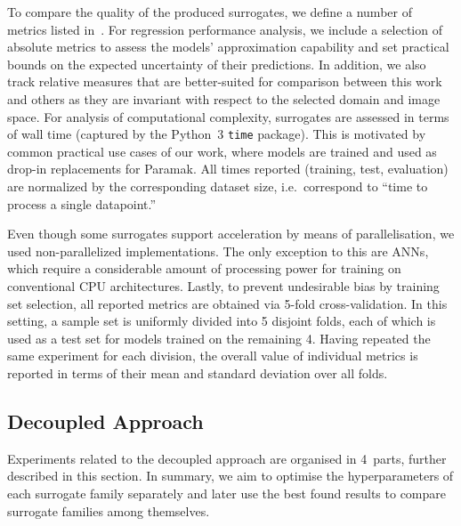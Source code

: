 To compare the quality of the produced surrogates, we define a number of metrics listed
in~. For regression performance analysis, we include a
selection of absolute metrics to assess the models' approximation capability and set
practical bounds on the expected uncertainty of their predictions. In addition, we also track
relative measures that are better-suited for comparison between this work and others as
they are invariant with respect to the selected domain and image space.
For analysis of computational complexity, surrogates are assessed in terms of wall
time (captured by the Python~3 \texttt{time} package). This is motivated by common practical use
cases of our work, where models are trained and used as drop-in replacements for
Paramak. All times reported (training, test, evaluation) are
normalized by the corresponding dataset size, i.e.~correspond to ``time to
process a single datapoint.''

Even though some surrogates support acceleration by means of parallelisation, we
used non-parallelized implementations. The only exception to this are ANNs,
which require a considerable amount of processing power for training on
conventional CPU architectures. Lastly, to prevent undesirable bias by training
set selection, all reported metrics are obtained via 5-fold cross-validation.
In this setting, a sample set is uniformly divided into 5 disjoint folds, each of which
is used as a test set for models trained on the remaining 4. Having repeated the
same experiment for each division, the overall value of individual metrics is
reported in terms of their mean and standard deviation over all folds.



\subsection{Decoupled Approach}\label{sec:experiment-methodology}

Experiments related to the decoupled approach are organised in 4~parts,
further described in this section. In summary, we aim to optimise the hyperparameters of
each surrogate family separately and later use the best found results to compare surrogate
families among themselves.

